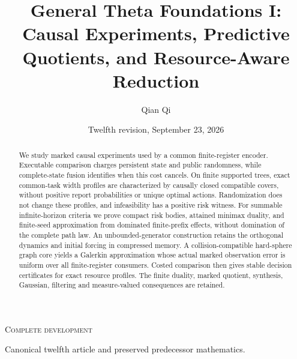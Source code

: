 
\newcommand{\Wone}{W_1}
\newcommand{\Del}{\Delta}
\newcommand{\emptyw}{\varnothing}
\newcommand{\osc}{\operatorname{osc}}
\newcommand{\diam}{\operatorname{diam}}
\newcommand{\Lipone}{\operatorname{Lip}_1}
\title[General Theta Foundations I]{General Theta Foundations I: Causal Experiments, Predictive Quotients, and Resource-Aware Reduction}
\author{Qian Qi}
\date{Twelfth revision, September 23, 2026}

\begin{abstract}
We study marked causal experiments used by a common finite-register
encoder. Executable comparison charges persistent state and public
randomness, while complete-state fusion identifies when this cost
cancels. On finite supported trees, exact common-task width profiles are
characterized by causally closed compatible covers, without positive
report probabilities or unique optimal actions. Randomization does not
change these profiles, and infeasibility has a positive risk witness.
For summable infinite-horizon criteria we prove compact risk bodies,
attained minimax duality, and finite-seed approximation from dominated
finite-prefix effects, without domination of the complete path law.
An unbounded-generator construction retains the orthogonal dynamics
and initial forcing in compressed memory. A collision-compatible
hard-sphere graph core yields a Galerkin approximation whose actual
marked observation error is uniform over all finite-register consumers.
Costed comparison then gives stable decision certificates for exact
resource profiles. The finite duality, marked quotient, synthesis,
Gaussian, filtering and measure-valued consequences are retained.
\end{abstract}
\maketitle
\ifcomplete
\begin{center}\small\textsc{Complete development}\par
Canonical twelfth article and preserved predecessor mathematics.
\end{center}
\fi
\tableofcontents
